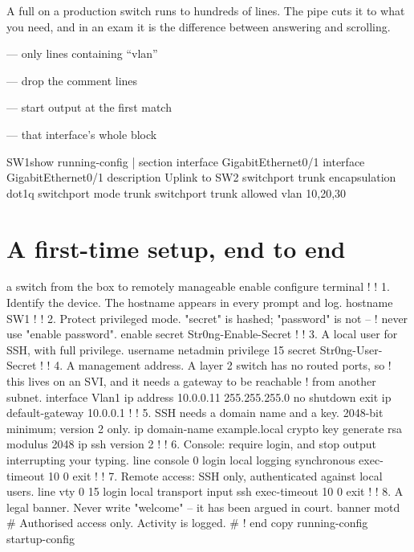 \begin{conceptbox}
A full  on a production switch runs to hundreds of
lines. The pipe cuts it to what you need, and in an exam it is the difference
between answering and scrolling.
\begin{tight}
  \item {} --- only lines containing ``vlan''
  \item {} --- drop the \cmd{!} comment lines
  \item {} --- start output at the first match
  \item {} --- that interface's whole block
\end{tight}
\end{conceptbox}

\begin{verify}{SW1}{show running-config | section interface GigabitEthernet0/1}
interface GigabitEthernet0/1
 description Uplink to SW2
 switchport trunk encapsulation dot1q
 switchport mode trunk
 switchport trunk allowed vlan 10,20,30
\end{verify}

\section{A first-time setup, end to end}

\begin{config}{a switch from the box to remotely manageable}
enable
configure terminal
!
! 1. Identify the device. The hostname appears in every prompt and log.
hostname SW1
!
! 2. Protect privileged mode. "secret" is hashed; "password" is not --
!    never use "enable password".
enable secret Str0ng-Enable-Secret
!
! 3. A local user for SSH, with full privilege.
username netadmin privilege 15 secret Str0ng-User-Secret
!
! 4. A management address. A layer 2 switch has no routed ports, so
!    this lives on an SVI, and it needs a gateway to be reachable
!    from another subnet.
interface Vlan1
 ip address 10.0.0.11 255.255.255.0
 no shutdown
exit
ip default-gateway 10.0.0.1
!
! 5. SSH needs a domain name and a key. 2048-bit minimum; version 2 only.
ip domain-name example.local
crypto key generate rsa modulus 2048
ip ssh version 2
!
! 6. Console: require login, and stop output interrupting your typing.
line console 0
 login local
 logging synchronous
 exec-timeout 10 0
exit
!
! 7. Remote access: SSH only, authenticated against local users.
line vty 0 15
 login local
 transport input ssh
 exec-timeout 10 0
exit
!
! 8. A legal banner. Never write "welcome" -- it has been argued in court.
banner motd # Authorised access only. Activity is logged. #
!
end
copy running-config startup-config
\end{config}

